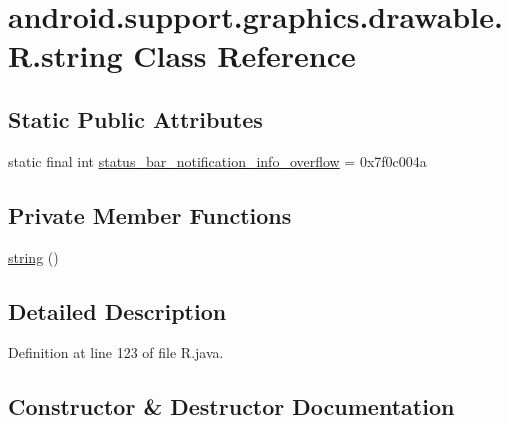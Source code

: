 \hypertarget{classandroid_1_1support_1_1graphics_1_1drawable_1_1_r_1_1string}{}\section{android.\+support.\+graphics.\+drawable.\+R.\+string Class Reference}
\label{classandroid_1_1support_1_1graphics_1_1drawable_1_1_r_1_1string}
\subsection*{Static Public Attributes}
\begin{DoxyCompactItemize}
\item 
static final int \mbox{\hyperlink{classandroid_1_1support_1_1graphics_1_1drawable_1_1_r_1_1string_afa1adb5f8eacaefd685b9cfa844e77de}{status\+\_\+bar\+\_\+notification\+\_\+info\+\_\+overflow}} = 0x7f0c004a
\end{DoxyCompactItemize}
\subsection*{Private Member Functions}
\begin{DoxyCompactItemize}
\item 
\mbox{\hyperlink{classandroid_1_1support_1_1graphics_1_1drawable_1_1_r_1_1string_ad7b50a14e3877a7eb2bb415ab99b39b6}{string}} ()
\end{DoxyCompactItemize}


\subsection{Detailed Description}


Definition at line 123 of file R.\+java.



\subsection{Constructor \& Destructor Documentation}
\mbox{\label{classandroid_1_1support_1_1graphics_1_1drawable_1_1_r_1_1string_ad7b50a14e3877a7eb2bb415ab99b39b6}} 
